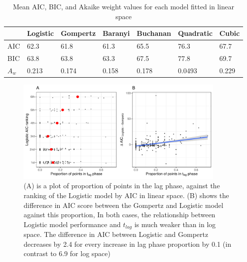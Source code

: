 \documentclass[11pt, a4paper]{article}
\begin{document}
                        \begin{table}[H]
\centering
\begin{tabular}{l|llllll}
       & Logistic & Gompertz & Baranyi & Buchanan & Quadratic & Cubic \\ \hline
AIC & 62.3    & 61.8    & 61.3   & 65.5    & 76.3     & 67.7 \\
BIC & 63.8    & 63.8    & 63.3   & 67.5    & 77.8     & 69.7 \\
$A_w$ & 0.213     & 0.174    & 0.158   & 0.178     & 0.0493     &   0.229

\end{tabular}
\caption{Mean AIC, BIC, and Akaike weight values for each model fitted in linear space}
\label{suptable:meanAICBIClinear}
\end{table}




        
                        \begin{figure}[H]
        \includegraphics[width=4in]{../results/tlag_vs_logistic_linear.pdf}
        \centering
        \caption{(A) is a plot of proportion of points in the lag phase, against the ranking of the Logistic model by AIC in linear space. (B) shows the difference in AIC score between the Gompertz and Logistic model against this proportion, In both cases, the relationship between Logistic model performance and $t_{lag}$ is much weaker than in log space. The difference in AIC between Logistic and Gompertz decreases by 2.4 for every increase in lag phase proportion by 0.1 (in contrast to 6.9 for log space)}
        \label{sup:tlag_logistic_linear}
        \end{figure} 
        
\end{document}
